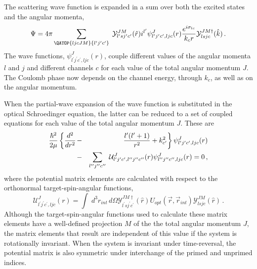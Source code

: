 The scattering wave function is expanded in a sum over both the excited
states and the angular momenta, 
\begin{equation}
\Psi=4\pi\sum_{{{\QATOP{ljcJM}{l^{\prime}j^{\prime}c^{\prime}}}}}\;{\mathcal{%
Y}}_{l^{\prime}sj^{\prime}c^{\prime}}^{JM}(\hat{r})i^{l^{\prime}}\psi_{l^{%
\prime}j^{\prime}c^{\prime},ljc}^{J}(r)\frac{e^{i\sigma_{lc}}}{k_{c}r}{%
\mathcal{Y}}_{lsjc}^{JM\dagger}(\hat{k})\,.  \label{cpar}
\end{equation}
The wave functions, $\psi_{l^{\prime}j^{\prime}c^{\prime},ljc}^{J}(r)$,
couple different values of the angular momenta $l$ and $j$ and different
channels $c$ for each value of the total angular momentum $J$. The Coulomb
phase now depends on the channel energy, through $k_{c}$, as well as on the
angular momentum.

When the partial-wave expansion of the wave function is substituted in the
optical Schroedinger equation, the latter can be reduced to a set of coupled
equations for each value of the total angular momentum $J$. These are 
\begin{eqnarray}
\frac{\hbar^{2}}{2\mu}\left\{ \frac{d^{2}}{dr^{2}}\right. & - & \left.\frac{%
l^{\prime}(l^{\prime}+1)}{r^{2}}+k_{c^{\prime}}^{2}\right\}
\psi_{l^{\prime}j^{\prime}c^{\prime},ljc}^{J}(r) \\
& - & \sum_{l^{\prime\prime}j^{\prime\prime}c^{\prime\prime}}\;{\mathcal{U}}%
_{l^{\prime}j^{\prime}c^{\prime},l^{\prime\prime}j^{\prime\prime}c^{\prime%
\prime}}^{J}(r)\psi_{l^{\prime\prime}j^{\prime\prime}c^{\prime%
\prime},ljc}^{J}(r)=0\,,  \notag
\end{eqnarray}
where the potential matrix elements are calculated with respect to the
orthonormal target-spin-angular functions, 
\begin{equation}
{\mathcal{U}}_{l^{\prime}j^{\prime}c^{\prime},ljc}^{J}(r)=\int\;
d^{3}r_{int}\, d\Omega{\mathcal{Y}}_{l^{\prime}sj^{\prime}c^{\prime}}^{JM%
\dagger}(\hat{r})U_{opt}(\vec{r},\vec{r}_{int}){\mathcal{Y}}_{lsjc}^{JM}(%
\hat{r})\,.  \label{uljc}
\end{equation}
Although the target-spin-angular functions used to calculate these matrix
elements have a well-defined projection $M$ of the the total angular
momentum $J$, the matrix elements that result are independent of this value
if the system is rotationally invariant. When the system is invariant under
time-reversal, the potential matrix is also symmetric under interchange of
the primed and unprimed indices.

